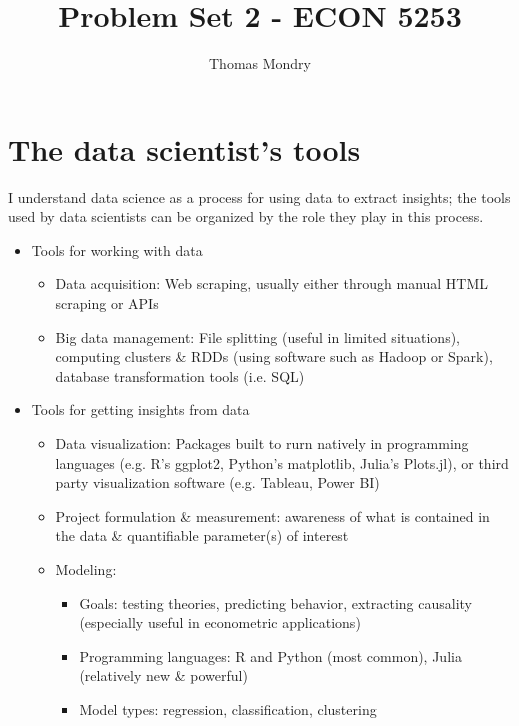 \documentclass{article}
\title{Problem Set 2 - ECON 5253}
\author{Thomas Mondry}
\begin{document}
\maketitle

\section{The data scientist's tools}

I understand data science as a process for using data to extract insights; the tools used by data scientists can be organized by the role they play in this process.

\begin{itemize}
    \item Tools for working with data
    \begin{itemize}
        \item Data acquisition: Web scraping, usually either through manual HTML scraping or APIs
        \item Big data management: File splitting (useful in limited situations), computing clusters \& RDDs (using software such as Hadoop or Spark), database transformation tools (i.e. SQL)
    \end{itemize}
    \item Tools for getting insights from data
    \begin{itemize}
        \item Data visualization: Packages built to rurn natively in programming languages (e.g. R's ggplot2, Python's matplotlib, Julia's Plots.jl), or third party visualization software (e.g. Tableau, Power BI)
        \item Project formulation \& measurement: awareness of what is contained in the data \& quantifiable parameter(s) of interest
        \item Modeling:
        \begin{itemize}
            \item Goals: testing theories, predicting behavior, extracting causality (especially useful in econometric applications)
            \item Programming languages: R and Python (most common), Julia (relatively new \& powerful)
            \item Model types: regression, classification, clustering
        \end{itemize}
    \end{itemize}
\end{itemize}
\end{document}
